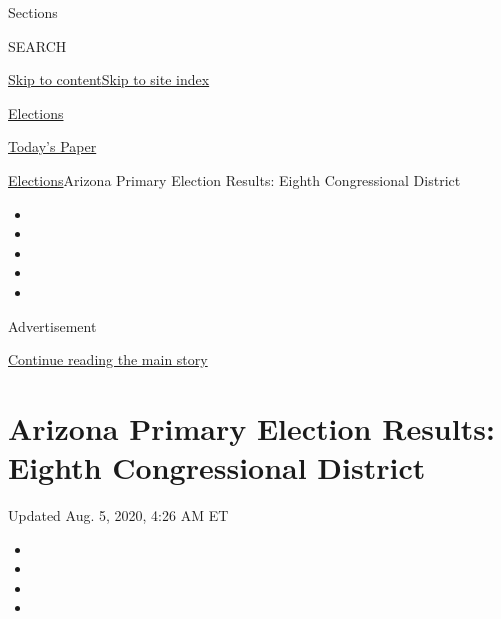 Sections

SEARCH

\protect\hyperlink{site-content}{Skip to
content}\protect\hyperlink{site-index}{Skip to site index}

\href{https://www.nytimes.com/news-event/2020-election}{Elections}

\href{https://myaccount.nytimes.com/auth/login?response_type=cookie\&client_id=vi}{}

\href{https://www.nytimes.com/section/todayspaper}{Today's Paper}

\href{/news-event/2020-election}{Elections}\textbar{}Arizona Primary
Election Results: Eighth Congressional District

\begin{itemize}
\item
\item
\item
\item
\item
\end{itemize}

Advertisement

\protect\hyperlink{after-top}{Continue reading the main story}

\hypertarget{arizona-primary-election-results-eighth-congressional-district}{%
\section{Arizona Primary Election Results: Eighth Congressional
District}\label{arizona-primary-election-results-eighth-congressional-district}}

Updated Aug. 5, 2020, 4:26 AM ET

\begin{itemize}
\item
\item
\item
\item
\end{itemize}

